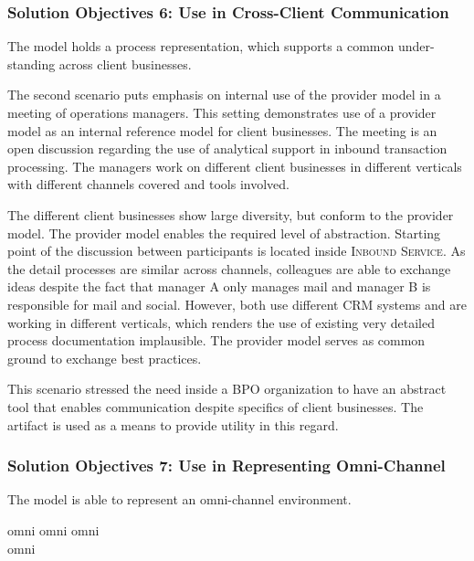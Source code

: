 \subsubsection{Solution Objectives 6: Use in Cross-Client Communication}
The model holds a process representation, which supports a common under- standing across client businesses.

The second scenario puts emphasis on internal use of the provider model in a meeting of operations managers. This setting demonstrates use of a provider model as an internal reference model for client businesses. The meeting is an open discussion regarding the use of analytical support in inbound transaction processing. The managers work on different client businesses in different verticals with different channels covered and tools involved. %

The different client businesses show large diversity, but conform to the provider model. The provider model enables the required level of abstraction. Starting point of the discussion between participants is located inside \textsc{Inbound Service}. As the detail processes are similar across channels, colleagues are able to exchange ideas despite the fact that manager A only manages mail and manager B is responsible for mail and social. However, both use different CRM systems and are working in different verticals, which renders the use of existing very detailed process documentation implausible. The provider model serves as common ground to exchange best practices. 

This scenario stressed the need inside a BPO organization to have an abstract tool that enables communication despite specifics of client businesses. The artifact is used as a means to provide utility in this regard. 

\subsubsection{Solution Objectives 7: Use in Representing Omni-Channel}
The model is able to represent an omni-channel environment.

omni omni omni\\ omni
